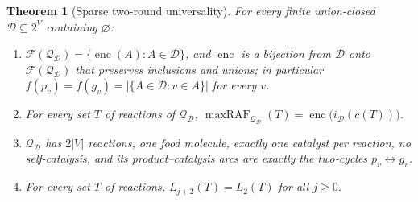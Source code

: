 \documentclass[11pt,a4paper]{article}
\theoremstyle{plain}
\newtheorem{theorem}{Theorem}[section]
\theoremstyle{definition}
\theoremstyle{remark}
\newcommand{\FF}{\mathcal F}
\newcommand{\DD}{\mathcal D}
\newcommand{\QQ}{\mathcal Q}
\newcommand{\enc}{\operatorname{enc}}
\newcommand{\mraf}{\operatorname{maxRAF}}
\begin{document}
\begin{theorem}[Sparse two-round universality]\label{thm:pair}
For every finite union-closed $\DD\subseteq2^V$ containing $\varnothing$:
\begin{enumerate}[label=(\roman*)]
\item $\FF(\QQ_\DD)=\{\enc(A):A\in\DD\}$, and $\enc$ is a bijection from $\DD$ onto
$\FF(\QQ_\DD)$ that preserves inclusions and unions; in particular
$f(p_v)=f(g_v)=|\{A\in\DD:v\in A\}|$ for every $v$.
\item For every set $T$ of reactions of $\QQ_\DD$, $\mraf_{\QQ_\DD}(T)=\enc\bigl(i_\DD(c(T))\bigr)$.
\item $\QQ_\DD$ has $2|V|$ reactions, one food molecule, exactly one catalyst per reaction,
no self-catalysis, and its product--catalysis arcs are exactly the two-cycles
$p_v\leftrightarrow g_v$.
\item For every set $T$ of reactions, $L_{j+2}(T)=L_2(T)$ for all $j\ge0$.
\end{enumerate}
\end{theorem}
\end{document}
